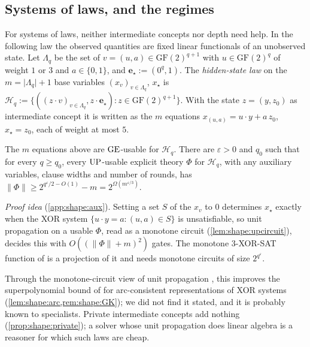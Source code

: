 \subsection{Systems of laws, and the regimes}\label{sec:shape:systems}

For systems of laws, neither intermediate concepts nor depth need help. In the following law the observed quantities are fixed linear functionals of an unobserved state. Let $\Lambda_q$ be the set of $v=(u,a)\in\mathrm{GF}(2)^{q+1}$ with $u\in\mathrm{GF}(2)^q$ of weight $1$ or $3$ and $a\in\{0,1\}$, and $\mathbf e_\star:=(0^q,1)$. The \emph{hidden-state law} on the $m=\lvert\Lambda_q\rvert+1$ base variables $(x_v)_{v\in\Lambda_q}$, $x_\star$ is $\mathcal H_q:=\{((z\cdot v)_{v\in\Lambda_q},z\cdot\mathbf e_\star):z\in\mathrm{GF}(2)^{q+1}\}$. With the state $z=(y,z_0)$ as intermediate concept it is written as the $m$ equations $x_{(u,a)}=u\cdot y+a\,z_0$, $x_\star=z_0$, each of weight at most $5$.

\begin{theorem}\label{thm:shape:systems}
The $m$ equations above are $\mathrm{GE}$-usable for $\mathcal H_q$. There are $\varepsilon>0$ and $q_0$ such that for every $q\ge q_0$, every $\mathrm{UP}$-usable explicit theory $\Phi$ for $\mathcal H_q$, with any auxiliary variables, clause widths and number of rounds, has $\lVert\Phi\rVert\ge2^{q^{\varepsilon}/2-O(1)}-m=2^{\Omega(m^{\varepsilon/3})}$.
\end{theorem}

\emph{Proof idea} (\cref{app:shape:aux}). Setting a set $S$ of the $x_v$ to $0$ determines $x_\star$ exactly when the XOR system $\{u\cdot y=a:(u,a)\in S\}$ is unsatisfiable, so unit propagation on a usable $\Phi$, read as a monotone circuit (\cref{lem:shape:upcircuit}), decides this with $O((\lVert\Phi\rVert+m)^2)$ gates. The monotone 3-XOR-SAT function of \citet{goos2019adventures} is a projection of it and needs monotone circuits of size $2^{q^{\varepsilon}}$.

Through the monotone-circuit view of unit propagation \citep{bessiere2009circuit}, this improves the superpolynomial bound of \citet{gwynne2014sat} for arc-consistent representations of XOR systems (\cref{lem:shape:arc,rem:shape:GK}); we did not find it stated, and it is probably known to specialists. Private intermediate concepts add nothing (\cref{prop:shape:private}); a solver whose unit propagation does linear algebra \citep{beame2026extending} is a reasoner for which such laws are cheap.

